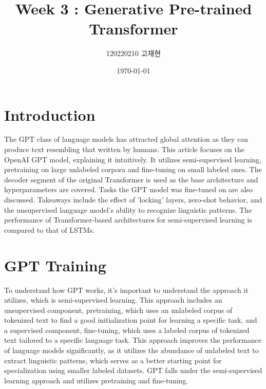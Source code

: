 \documentclass[
	11pt,
	a4paper,
	figtabcapt,
]{oblivoir}
\title{\vspace{-4cm}Week 3 : Generative Pre-trained Transformer}
\author{120220210 고재현}
\date{\today}
\begin{document}


\maketitle




\setcounter{table}{0}		                    %
\setcounter{figure}{0}		                    %



\section{Introduction}
The GPT class of language models has attracted global attention as they can produce text resembling that written by humans. This article focuses on the OpenAI GPT model, explaining it intuitively.
It utilizes semi-supervised learning, pretraining on large unlabeled corpora and fine-tuning on small labeled ones. The decoder segment of the original Transformer is used as the base architecture and hyperparameters are covered.
Tasks the GPT model was fine-tuned on are also discussed. Takeaways include the effect of 'locking' layers, zero-shot behavior, and the unsupervised language model's ability to recognize linguistic patterns.
The performance of Transformer-based\cite{NIPS2017_3f5ee243} architectures for semi-supervised learning is compared to that of LSTMs.

\section{GPT Training}\label{sec:training}
To understand how GPT works, it's important to understand the approach it utilizes, which is semi-supervised learning.
This approach includes an unsupervised component, pretraining, which uses an unlabeled corpus of tokenized text to find a good initialization point for learning a specific task, and a supervised component, fine-tuning, which uses a labeled corpus of tokenized text tailored to a specific language task.
This approach improves the performance of language models significantly, as it utilizes the abundance of unlabeled text to extract linguistic patterns, which serves as a better starting point for specialization using smaller labeled datasets.
GPT falls under the semi-supervised learning approach and utilizes pretraining and fine-tuning.
\end{document}
